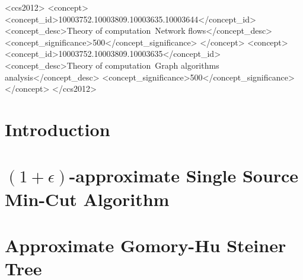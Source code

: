 \documentclass[sigconf,screen]{acmart}
\newcommand{\e}{\epsilon}
\newcommand{\1}{\mathbbm 1}
\begin{document}
\begin{CCSXML}
<ccs2012>
<concept>
<concept_id>10003752.10003809.10003635.10003644</concept_id>
<concept_desc>Theory of computation~Network flows</concept_desc>
<concept_significance>500</concept_significance>
</concept>
<concept>
<concept_id>10003752.10003809.10003635</concept_id>
<concept_desc>Theory of computation~Graph algorithms analysis</concept_desc>
<concept_significance>500</concept_significance>
</concept>
</ccs2012>
\end{CCSXML}






\maketitle


\section{Introduction}
\label{sec:introduction}


%

\section{$(1+\e)$-approximate Single Source Min-Cut Algorithm}


\section{Approximate Gomory-Hu Steiner Tree}


\balance







%
\end{document}
